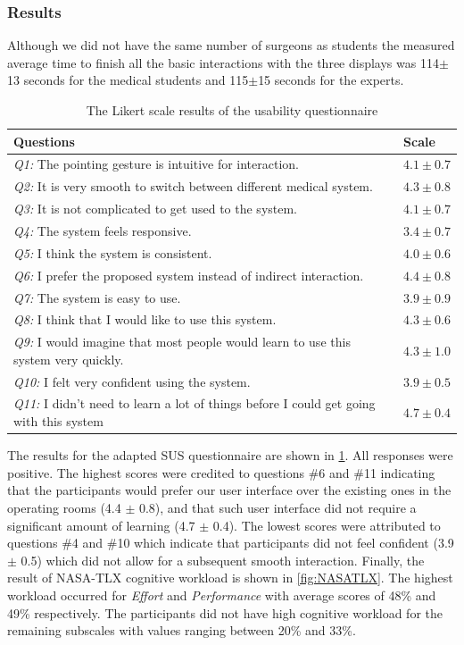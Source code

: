 \subsubsection{Results}
Although we did not have the same number of surgeons as students the measured average time to finish all the basic interactions with the three displays was 114$\pm$13 seconds for the medical students and 115$\pm$15 seconds for the experts. 
\begin{table}
	\caption{The Likert scale results of the usability questionnaire}
	\label{tb:questionnaire}
	\scriptsize
	\begin{center}
		\begin{tabular}{p{10cm}|p{1.2cm}}
			Questions & Scale \\
			\hline
			\textit{Q1:} The pointing gesture is intuitive for interaction. &  $4.1\pm0.7$ \\
			\textit{Q2:} It is very smooth to switch between different medical system. & $4.3\pm0.8$ \\
			\textit{Q3:} It is not complicated to get used to the system. & $4.1\pm0.7$ \\
			\textit{Q4:} The system feels responsive. & $3.4\pm0.7$\\
			\textit{Q5:} I  think the system is consistent. & $4.0\pm0.6$ \\
			\textit{Q6:} I prefer the proposed system instead of indirect interaction. & $4.4\pm0.8$ \\
			\textit{Q7:} The system is easy to use.& $3.9\pm0.9$ \\
			\textit{Q8:} I think that I would like to use this system. & $4.3\pm0.6$ \\
			\textit{Q9:} I would imagine that most people would learn to use this system very quickly. & $4.3\pm1.0$ \\
			\textit{Q10:} I felt very confident using the system. & $3.9\pm0.5$ \\
			\textit{Q11:} I didn't need to learn a lot of things before I could get going with this system & $4.7\pm0.4$
		\end{tabular}
	\end{center}
\end{table}
The results for the adapted SUS questionnaire are shown in \tablename{\ref{tb:questionnaire}}.
All responses were positive. The highest scores were credited to questions \#6 and \#11  indicating that the participants would prefer our user interface over the existing ones in the operating rooms (4.4 $\pm$ 0.8), and that such user interface did not require a significant amount of learning (4.7 $\pm$ 0.4). The lowest scores were attributed to questions \#4 and \#10 which indicate that participants did not feel confident (3.9 $\pm$ 0.5) which did not allow for a subsequent smooth interaction. Finally, the result of NASA-TLX cognitive workload is shown in \figurename{\ref{fig:NASATLX}}. The highest workload occurred for \textit{Effort} and \textit{Performance} with average scores of 48\% and 49\% respectively. The participants did not have high cognitive workload for the remaining subscales with values ranging between 20\% and 33\%.

